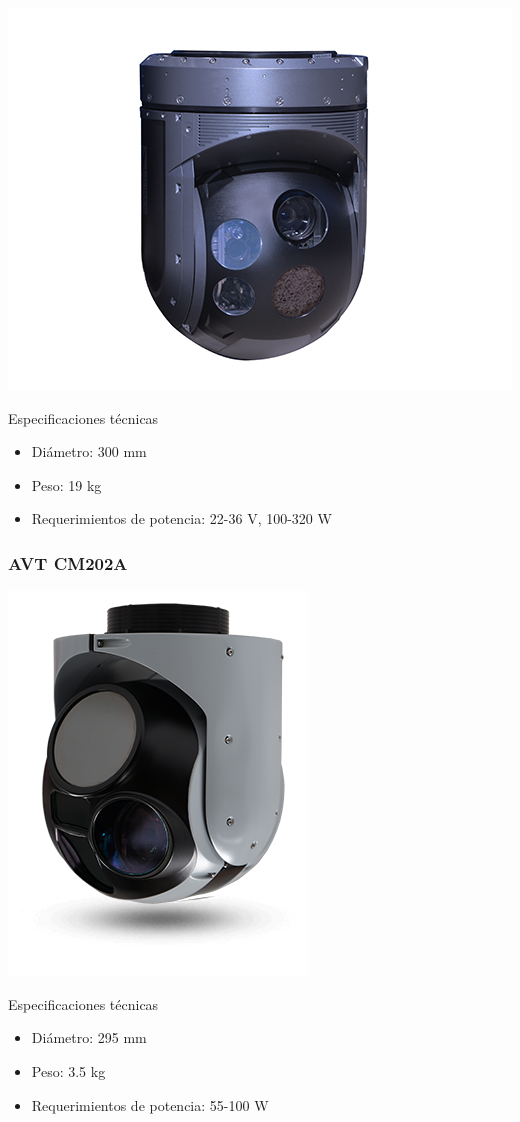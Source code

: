 \noindent\begin{minipage}{0.3\textwidth}%
	\includegraphics[width=\linewidth]{imagenes/TC-300}
\end{minipage}%
\hfill%
\begin{minipage}{0.7\textwidth}
	Especificaciones técnicas
	\begin{itemize}
		\item Diámetro: 300 mm
		\item Peso: 19 kg
		\item Requerimientos de potencia: 22-36 V, 100-320 W
	\end{itemize}
\end{minipage}

\subsubsection*{AVT CM202A}

\noindent\begin{minipage}{0.3\textwidth}%
	\includegraphics[width=30 mm]{imagenes/cm202a}
\end{minipage}%
\hfill%
\begin{minipage}{0.7\textwidth}
	Especificaciones técnicas
	\begin{itemize}
		\item Diámetro: 295 mm
		\item Peso: 3.5 kg
		\item Requerimientos de potencia: 55-100 W
	\end{itemize}
\end{minipage}

